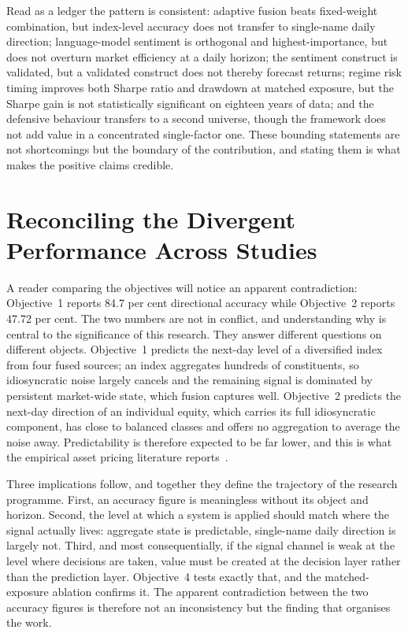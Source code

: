 Read as a ledger the pattern is consistent: adaptive fusion beats fixed-weight combination, but
index-level accuracy does not transfer to single-name daily direction; language-model sentiment
is orthogonal and highest-importance, but does not overturn market efficiency at a daily
horizon; the sentiment construct is validated, but a validated construct does not thereby
forecast returns; regime risk timing improves both Sharpe ratio and drawdown at matched
exposure, but the Sharpe gain is not statistically significant on eighteen years of data; and
the defensive behaviour transfers to a second universe, though the framework does not add value
in a concentrated single-factor one. These bounding statements are not shortcomings but the
boundary of the contribution, and stating them is what makes the positive claims credible.

\section{Reconciling the Divergent Performance Across Studies}

A reader comparing the objectives will notice an apparent contradiction: Objective~1 reports
84.7 per cent directional accuracy while Objective~2 reports 47.72 per cent. The two numbers are
not in conflict, and understanding why is central to the significance of this research. They
answer different questions on different objects. Objective~1 predicts the next-day level of a
diversified index from four fused sources; an index aggregates hundreds of constituents, so
idiosyncratic noise largely cancels and the remaining signal is dominated by persistent
market-wide state, which fusion captures well. Objective~2 predicts the next-day direction of an
individual equity, which carries its full idiosyncratic component, has close to balanced classes
and offers no aggregation to average the noise away. Predictability is therefore expected to be
far lower, and this is what the empirical asset pricing literature
reports~\cite{gu2020,fama1970}.

Three implications follow, and together they define the trajectory of the research programme.
First, an accuracy figure is meaningless without its object and horizon. Second, the level at
which a system is applied should match where the signal actually lives: aggregate state is
predictable, single-name daily direction is largely not. Third, and most consequentially, if the
signal channel is weak at the level where decisions are taken, value must be created at the
decision layer rather than the prediction layer. Objective~4 tests exactly that, and the
matched-exposure ablation confirms it. The apparent contradiction between the two accuracy
figures is therefore not an inconsistency but the finding that organises the work.

